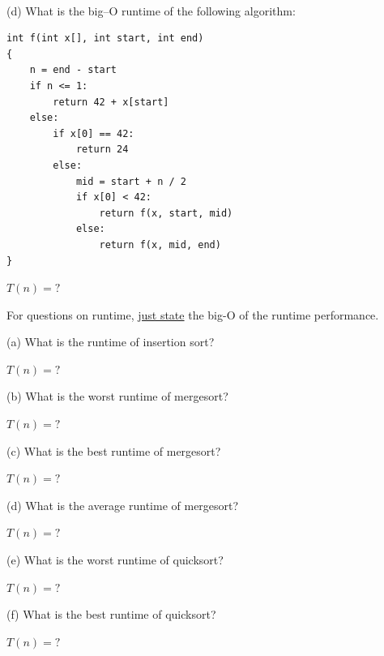 \mbox{}\\
(d)
What is the big--O runtime of the following algorithm:
\begin{Verbatim}[frame=single]
int f(int x[], int start, int end)
{
    n = end - start
    if n <= 1:
        return 42 + x[start]
    else:
        if x[0] == 42:
            return 24
        else:
            mid = start + n / 2
            if x[0] < 42:
                return f(x, start, mid)
            else:
                return f(x, mid, end) 
}
\end{Verbatim}
\ANSWER
\begin{answerlong}
$T(n) = ?$
\end{answerlong}


\newpage
\nextq %
For questions on runtime,
\underline{just state} the big-O of the runtime performance.

(a)
What is the runtime of insertion sort?
\\
\ANSWER
\begin{answerlong}
$T(n) = ?$
\end{answerlong}
  
(b)
What is the worst runtime of mergesort?
\\
\ANSWER
\begin{answerlong}
$T(n) = ?$
\end{answerlong}

(c)
What is the best runtime of mergesort?
\\
\ANSWER
\begin{answerlong}
$T(n) = ?$
\end{answerlong}
  
(d)
What is the average runtime of mergesort?
\\
\ANSWER
\begin{answerlong}
$T(n) = ?$
\end{answerlong}
  
(e)
What is the worst runtime of quicksort?
\\
\ANSWER
\begin{answerlong}
$T(n) = ?$
\end{answerlong}
  
(f)
What is the best runtime of quicksort?
\\
\ANSWER
\begin{answerlong}
$T(n) = ?$
\end{answerlong}
  
